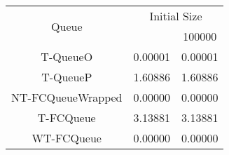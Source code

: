 \begin{tabular}{|c|c|c|}
\hline
\multirow{2}{*}{Queue} & \multicolumn{2}{c|}{Initial Size}\\\cline{2-3}& \qquad 10000 \qquad\quad & 100000\\
\hline
\hline
T-QueueO & 0.00001 & 0.00001\\
T-QueueP & 1.60886 & 1.60886\\
NT-FCQueueWrapped & 0.00000 & 0.00000\\
T-FCQueue & 3.13881 & 3.13881\\
WT-FCQueue & 0.00000 & 0.00000\\
\hline\end{tabular}
